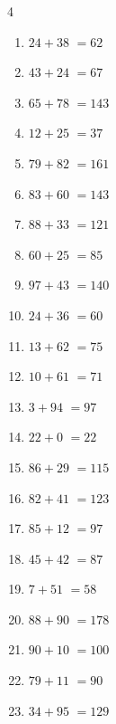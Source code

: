 \begin{multicols}{4}
\begin{enumerate}
  \item $24+38$
        $=62$

  \item $43+24$
        $=67$

  \item $65+78$
        $=143$

  \item $12+25$
        $=37$

  \item $79+82$
        $=161$

  \item $83+60$
        $=143$

  \item $88+33$
        $=121$

  \item $60+25$
        $=85$

  \item $97+43$
        $=140$

  \item $24+36$
        $=60$

  \item $13+62$
        $=75$

  \item $10+61$
        $=71$

  \item $3+94$
        $=97$

  \item $22+0$
        $=22$

  \item $86+29$
        $=115$

  \item $82+41$
        $=123$

  \item $85+12$
        $=97$

  \item $45+42$
        $=87$

  \item $7+51$
        $=58$

  \item $88+90$
        $=178$

\columnbreak %

\resetques

  \item $90+10$
        $=100$

  \item $79+11$
        $=90$

  \item $34+95$
        $=129$


\end{enumerate}
\end{multicols}
